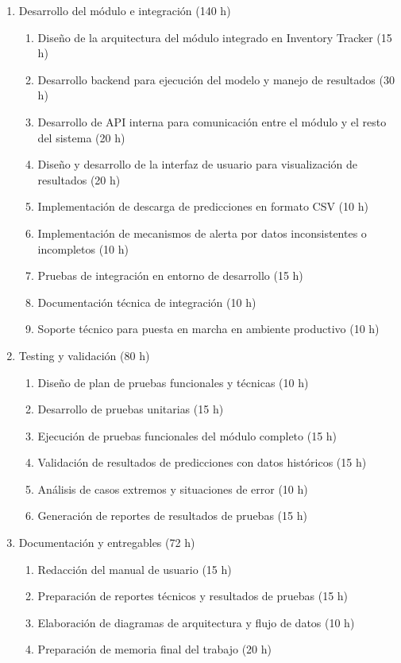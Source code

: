 \documentclass[
11pt, %
]{charter}
\begin{document}
\begin{enumerate}
\begin{enumerate}
\end{enumerate}
\item Desarrollo del módulo e integración (140 h)
\begin{enumerate}
\item Diseño de la arquitectura del módulo integrado en Inventory Tracker (15 h)
\item Desarrollo backend para ejecución del modelo y manejo de resultados (30 h)
\item Desarrollo de API interna para comunicación entre el módulo y el resto del sistema (20 h)
\item Diseño y desarrollo de la interfaz de usuario para visualización de resultados (20 h)
\item Implementación de descarga de predicciones en formato CSV (10 h)
\item Implementación de mecanismos de alerta por datos inconsistentes o incompletos (10 h)
\item Pruebas de integración en entorno de desarrollo (15 h)
\item Documentación técnica de integración (10 h)
\item Soporte técnico para puesta en marcha en ambiente productivo (10 h)
\end{enumerate}
\item Testing y validación (80 h)
\begin{enumerate}
\item Diseño de plan de pruebas funcionales y técnicas (10 h)
\item Desarrollo de pruebas unitarias (15 h)
\item Ejecución de pruebas funcionales del módulo completo (15 h)
\item Validación de resultados de predicciones con datos históricos (15 h)
\item Análisis de casos extremos y situaciones de error (10 h)
\item Generación de reportes de resultados de pruebas (15 h)
\end{enumerate}
\item Documentación y entregables (72 h)
\begin{enumerate}
\item Redacción del manual de usuario (15 h)
\item Preparación de reportes técnicos y resultados de pruebas (15 h)
\item Elaboración de diagramas de arquitectura y flujo de datos (10 h)
\item Preparación de memoria final del trabajo (20 h)

\end{enumerate}
\end{enumerate}
\end{document}
